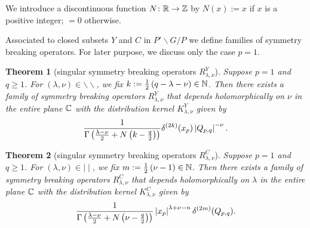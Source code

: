 \documentclass[reqno,12pt]{pja00} %
\newtheorem{theorem}{Theorem}[section]
\theoremstyle{definition}
\theoremstyle{exampstyle} \newtheorem{examp}[theorem]{Theorem}
\renewcommand{\Q}{Q_{p,q}}
\begin{document}
We introduce a discontinuous function $N\colon\mathbb{R}\to\mathbb{Z}$ by $N(x):=x$ if $x$ is a positive integer; $=0$ otherwise.

Associated to closed subsets $Y$ and $C$ in $P'\backslash G/P$ we define families of symmetry breaking operators. For later purpose, we discuss only the case $p=1$.
\begin{theorem}[singular symmetry breaking operators $R_{\lambda,\nu}^Y$]\label{thm:singY}
	Suppose $p=1$ and $q\ge1$. For $(\lambda,\nu)\in\backslash\backslash$, we fix $k:=\frac{1}{2}\left( q-\lambda-\nu \right)\in\mathbb{N}$. Then there exists a family of symmetry breaking operators
	$R_{\lambda,\nu}^Y$ that depends holomorphically on $\nu$ in the entire plane $\mathbb{C}$ with the distribution kernel $K_{\lambda,\nu}^Y$ given by\begin{equation*}
		\frac{1}{\Gamma\left( \frac{\lambda-\nu}{2}+N\left( k-\frac{q}{2} \right) \right)}\delta^{(2k)}(x_p)\myabs{\Q}^{-\nu}.
	\end{equation*}
\end{theorem}
\begin{theorem}[singular symmetry breaking operators $R_{\lambda,\nu}^C$]\label{thm:singC}
	Suppose $p=1$ and $q\ge1$. For $(\lambda,\nu)\in\mid\mid$, we fix $m:=\frac{1}{2}\left(\nu-1 \right)\in\mathbb{N}$. Then there exists a family of symmetry breaking operators
	$R_{\lambda,\nu}^C$ that depends holomorphically on $\lambda$ in the entire plane $\mathbb{C}$ with the distribution kernel $K_{\lambda,\nu}^C$ given by
	\begin{equation*}
	\frac{1}{\Gamma\left( \frac{\lambda-\nu}{2}+N\left(\nu- \frac{q}{2} \right) \right)}\myabs{x_p}^{\lambda+\nu-n}\delta^{(2m)}(\Q).
	\end{equation*}
\end{theorem}
\end{document}
